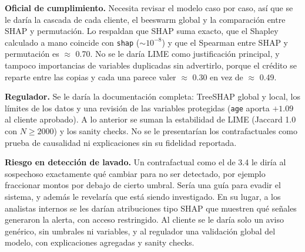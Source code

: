 \documentclass[11pt]{article}
\renewcommand{\_}{\textunderscore\allowbreak{}}
\begin{document}
\textbf{Oficial de cumplimiento.} Necesita revisar el modelo caso por caso, así que se le daría la cascada de cada cliente, el beeswarm global y la comparación entre SHAP y permutación. Lo respaldan que SHAP suma exacto, que el Shapley calculado a mano coincide con \texttt{shap} (\(\sim10^{-8}\)) y que el Spearman entre SHAP y permutación es \(\approx\) 0.70. No se le daría LIME como justificación principal, y tampoco importancias de variables duplicadas sin advertirlo, porque el crédito se reparte entre las copias y cada una parece valer \(\approx\) 0.30 en vez de \(\approx\) 0.49.

\textbf{Regulador.} Se le daría la documentación completa: TreeSHAP global y local, los límites de los datos y una revisión de las variables protegidas (\texttt{age} aporta \(+1.09\) al cliente aprobado). A lo anterior se suman la estabilidad de LIME (Jaccard 1.0 con \(N \geq 2000\)) y los sanity checks. No se le presentarían los contrafactuales como prueba de causalidad ni explicaciones sin su fidelidad reportada.

\textbf{Riesgo en detección de lavado.} Un contrafactual como el de 3.4 le diría al sospechoso exactamente qué cambiar para no ser detectado, por ejemplo fraccionar montos por debajo de cierto umbral. Sería una guía para evadir el sistema, y además le revelaría que está siendo investigado. En su lugar, a los analistas internos se les darían atribuciones tipo SHAP que muestren qué señales generaron la alerta, con acceso restringido. Al cliente se le daría solo un aviso genérico, sin umbrales ni variables, y al regulador una validación global del modelo, con explicaciones agregadas y sanity checks.

\newpage

\printbibliography
\end{document}
